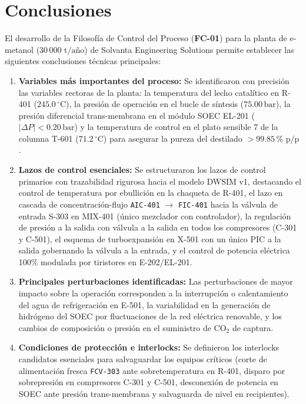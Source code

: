 \documentclass[10pt,letterpaper]{article}
\begin{document}
\vspace{0.15cm}
\section{Conclusiones}
El desarrollo de la Filosofía de Control del Proceso (\textbf{FC-01}) para la planta de e-metanol ($30\,000\text{ t/año}$) de Solvanta Engineering Solutions permite establecer las siguientes conclusiones técnicas principales:

\begin{enumerate}
    \item \textbf{Variables más importantes del proceso:} Se identificaron con precisión las variables rectoras de la planta: la temperatura del lecho catalítico en R-401 ($245.0\,^\circ\text{C}$), la presión de operación en el bucle de síntesis ($75.00\,\text{bar}$), la presión diferencial trans-membrana en el módulo SOEC EL-201 ($|\Delta P| < 0.20\,\text{bar}$) y la temperatura de control en el plato sensible 7 de la columna T-601 ($71.2\,^\circ\text{C}$) para asegurar la pureza del destilado $>99.85\,\%\text{ p/p}$.
    \item \textbf{Lazos de control esenciales:} Se estructuraron los lazos de control primarios con trazabilidad rigurosa hacia el modelo DWSIM v1, destacando el control de temperatura por ebullición en la chaqueta de R-401, el lazo en cascada de concentración-flujo \texttt{AIC-401} $\to$ \texttt{FIC-401} hacia la válvula de entrada S-303 en MIX-401 (único mezclador con controlador), la regulación de presión a la salida con válvula a la salida en todos los compresores (C-301 y C-501), el esquema de turboexpansión en X-501 con un único PIC a la salida gobernando la válvula a la entrada, y el control de potencia eléctrica 100\% modulada por tiristores en E-202/EL-201.
    \item \textbf{Principales perturbaciones identificadas:} Las perturbaciones de mayor impacto sobre la operación corresponden a la interrupción o calentamiento del agua de refrigeración en E-501, la variabilidad en la generación de hidrógeno del SOEC por fluctuaciones de la red eléctrica renovable, y los cambios de composición o presión en el suministro de $\text{CO}_2$ de captura.
    \item \textbf{Condiciones de protección e interlocks:} Se definieron los interlocks candidatos esenciales para salvaguardar los equipos críticos (corte de alimentación fresca \texttt{FCV-303} ante sobretemperatura en R-401, disparo por sobrepresión en compresores C-301 y C-501, desconexión de potencia en SOEC ante presión trans-membrana y salvaguarda de nivel en recipientes).

\end{enumerate}
\end{document}
